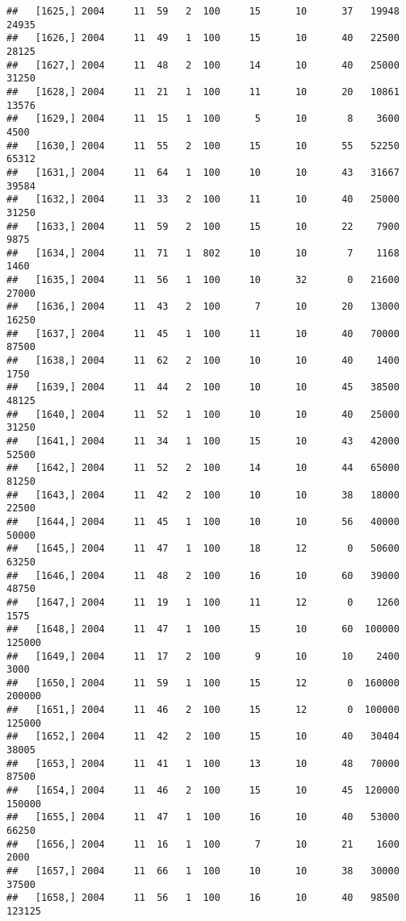 \documentclass{article}\usepackage[]{graphicx}\usepackage[]{color}
\makeatletter
\newenvironment{kframe}{%
 \def\at@end@of@kframe{}%
 \ifinner\ifhmode%
  \def\at@end@of@kframe{\end{minipage}}%
  \begin{minipage}{\columnwidth}%
 \fi\fi%
 \def\FrameCommand##1{\hskip\@totalleftmargin \hskip-\fboxsep
 \colorbox{shadecolor}{##1}\hskip-\fboxsep
     \hskip-\linewidth \hskip-\@totalleftmargin \hskip\columnwidth}%
 \MakeFramed {\advance\hsize-\width
   \@totalleftmargin\z@ \linewidth\hsize
   \@setminipage}}%
 {\par\unskip\endMakeFramed%
 \at@end@of@kframe}
\newenvironment{knitrout}{}{} %
\makeatother
\begin{document}
\begin{knitrout}
\begin{kframe}
\begin{verbatim}
##   [1625,] 2004     11  59   2  100     15      10      37   19948   24935
##   [1626,] 2004     11  49   1  100     15      10      40   22500   28125
##   [1627,] 2004     11  48   2  100     14      10      40   25000   31250
##   [1628,] 2004     11  21   1  100     11      10      20   10861   13576
##   [1629,] 2004     11  15   1  100      5      10       8    3600    4500
##   [1630,] 2004     11  55   2  100     15      10      55   52250   65312
##   [1631,] 2004     11  64   1  100     10      10      43   31667   39584
##   [1632,] 2004     11  33   2  100     11      10      40   25000   31250
##   [1633,] 2004     11  59   2  100     15      10      22    7900    9875
##   [1634,] 2004     11  71   1  802     10      10       7    1168    1460
##   [1635,] 2004     11  56   1  100     10      32       0   21600   27000
##   [1636,] 2004     11  43   2  100      7      10      20   13000   16250
##   [1637,] 2004     11  45   1  100     11      10      40   70000   87500
##   [1638,] 2004     11  62   2  100     10      10      40    1400    1750
##   [1639,] 2004     11  44   2  100     10      10      45   38500   48125
##   [1640,] 2004     11  52   1  100     10      10      40   25000   31250
##   [1641,] 2004     11  34   1  100     15      10      43   42000   52500
##   [1642,] 2004     11  52   2  100     14      10      44   65000   81250
##   [1643,] 2004     11  42   2  100     10      10      38   18000   22500
##   [1644,] 2004     11  45   1  100     10      10      56   40000   50000
##   [1645,] 2004     11  47   1  100     18      12       0   50600   63250
##   [1646,] 2004     11  48   2  100     16      10      60   39000   48750
##   [1647,] 2004     11  19   1  100     11      12       0    1260    1575
##   [1648,] 2004     11  47   1  100     15      10      60  100000  125000
##   [1649,] 2004     11  17   2  100      9      10      10    2400    3000
##   [1650,] 2004     11  59   1  100     15      12       0  160000  200000
##   [1651,] 2004     11  46   2  100     15      12       0  100000  125000
##   [1652,] 2004     11  42   2  100     15      10      40   30404   38005
##   [1653,] 2004     11  41   1  100     13      10      48   70000   87500
##   [1654,] 2004     11  46   2  100     15      10      45  120000  150000
##   [1655,] 2004     11  47   1  100     16      10      40   53000   66250
##   [1656,] 2004     11  16   1  100      7      10      21    1600    2000
##   [1657,] 2004     11  66   1  100     10      10      38   30000   37500
##   [1658,] 2004     11  56   1  100     16      10      40   98500  123125

\end{verbatim}
\end{kframe}
\end{knitrout}
\end{document}
